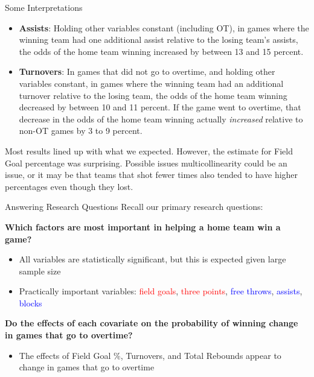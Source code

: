 \documentclass{beamer}
\begin{document}
\begin{frame}{Some Interpretations}
 
\begin{itemize}
	\item \textbf{Assists}: Holding other variables constant (including OT), in games where the winning team had one additional assist relative to the losing team's assists, the odds of the home team winning increased by between 13 and 15 percent. 
	\item \textbf{Turnovers}: In games that did not go to overtime, and holding other variables constant, in games where the winning team had an additional turnover relative to the losing team, the odds of the home team winning decreased by between 10 and 11 percent. If the game went to overtime, that decrease in the odds of the home team winning actually \textit{increased} relative to non-OT games by 3 to 9 percent. 
	

\end{itemize}
Most results lined up with what we expected. However, the estimate for Field Goal percentage was surprising. Possible issues multicollinearity could be an issue, or it may be that teams that shot fewer times also tended to have higher percentages even though they lost.  


\end{frame}
	
	
	
\begin{frame}{Answering Research Questions}
Recall our primary research questions: 

\textbf{Which factors are most important in helping a home team win a game?}
\begin{itemize}
	\item All variables are statistically significant, but this is expected given large sample size
	\item Practically important variables: \textcolor{red}{field goals}, \textcolor{red}{three points}, \textcolor{blue}{free throws}, \textcolor{blue}{assists}, \textcolor{blue}{blocks}
	\end{itemize}
		
\textbf{Do the effects of each covariate on the probability of winning change in games that go to overtime?}
\begin{itemize}
	\item The effects of Field Goal \%, Turnovers, and Total Rebounds appear to change in games that go to overtime
\end{itemize}



\end{frame}	
\end{document}
